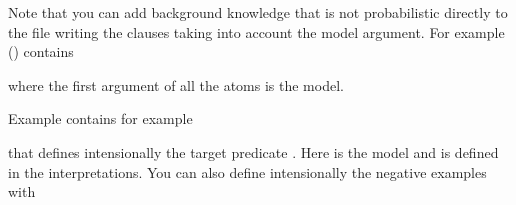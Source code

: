 \documentclass[letterpaper,10pt,english]{sphinxmanual}
\begin{document}
\sphinxAtStartPar
Note that you can add background knowledge that is not probabilistic directly to the file writing the clauses taking into account the model argument.
For example () contains

\begin{sphinxVerbatim}[commandchars=\\\{\}]
          
         

 
 
\end{sphinxVerbatim}

\sphinxAtStartPar
where the first argument of all the atoms is the model.

\sphinxAtStartPar
Example  contains for example

\begin{sphinxVerbatim}[commandchars=\\\{\}]
   
\end{sphinxVerbatim}

\sphinxAtStartPar
that defines intensionally the target predicate . Here  is the model and  is defined in the interpretations.
You can also define intensionally the negative examples with
\end{document}
